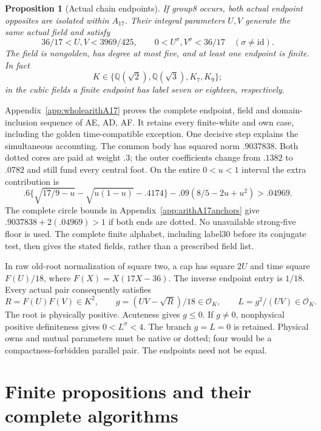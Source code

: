 \documentclass[11pt]{article}
\newtheorem{proposition}[theorem]{Proposition}
\newcommand{\QQ}{\mathbb Q}
\newcommand{\OK}{\mathcal O_K}
\newcommand{\supp}[1]{\textsf{#1}}
\begin{document}
\begin{proposition}[Actual chain endpoints]\label{prop:a17reduce}
If group8 occurs, both actual endpoint opposites are isolated within
$A_{17}$. Their integral parameters $U,V$ generate the same actual
field and satisfy
\begin{equation}\label{eq:a17strip}
 36/17<U,V<3969/425,\qquad
 0<U^\sigma,V^\sigma<36/17\quad(\sigma\ne\mathrm{id}).
\end{equation}
The field is nongolden, has degree at most five, and at least one
endpoint is finite. In fact
\[
 K\in\{\QQ(\sqrt2),\QQ(\sqrt3),K_7,K_9\};
\]
in the cubic fields a finite endpoint has label seven or eighteen,
respectively.
\end{proposition}
Appendix~\ref{app:wholearithA17} proves the complete endpoint,
field and domain-inclusion sequence of \supp{AE}, \supp{AD}, \supp{AF}.
It retains every finite-white and own case, including the golden
time-compatible exception.
One decisive step explains the simultaneous accounting.
The common body has squared norm $.9037838$. Both dotted cores
are paid at weight $.3$; the outer coefficients change from
$.1382$ to $.0782$ and still fund every central foot.
On the entire $0<u<1$ interval the extra contribution is
\[
 .6\{\sqrt{17/9-u}-\sqrt{u(1-u)}-.4174\}
 -.09(8/5-2u+u^2)>.04969.
\]
The complete circle bounds in Appendix~\ref{app:arithA17anchors} give
$.9037838+2(.04969)>1$ if both ends are dotted.
No unavailable strong-five floor is used.
The complete finite alphabet, including label30 before its conjugate
test, then gives the stated fields, rather than a prescribed field list.

In raw old-root normalization of square two, a cap has square $2U$
and time square $F(U)/18$, where $F(X)=X(17X-36)$.
The inverse endpoint entry is $1/18$. Every actual pair consequently
satisfies
\begin{equation}\label{eq:a17cycles}
 R=F(U)F(V)\in K^2,\qquad
 g=(UV-\sqrt R)/18\in\OK,\qquad L=g^2/(UV)\in\OK.
\end{equation}
The root is physically positive. Acuteness gives $g\le0$.
If $g\ne0$, nonphysical positive definiteness gives $0<L^\sigma<4$.
The branch $g=L=0$ is retained. Physical owns and mutual parameters
must be native or dotted; four would be a compactness-forbidden
parallel pair. The endpoints need not be equal.

\section{Finite propositions and their complete algorithms}\label{sec:algorithms}
\end{document}
